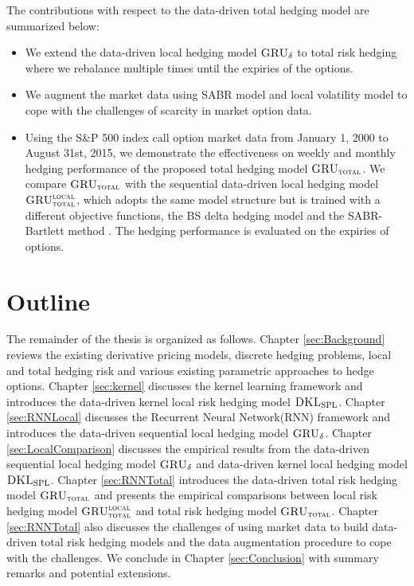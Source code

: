 \documentclass[letterpaper,12pt,titlepage,oneside,final]{book}
\numberwithin{equation}{section}
\theoremstyle{definition}
\newcommand{\model}{\textsc{GRU}_\delta}
\newcommand{\modelT}{\textsc{GRU}_{\textsc{total}}}
\newcommand{\modelL}{\textsc{GRU}_{\textsc{total}}^{\textsc{local}}}
\newcommand{\DKLs}{\bf\textsc{DKL}_{\text{SPL}}}
\begin{document}
The contributions with respect to the data-driven total hedging model \cite{knian2020} are summarized below:
\begin{itemize}
	\item  We extend the data-driven local hedging model $\model$ \cite{knian2019} to total risk hedging  where we rebalance multiple times until the expiries of the options.
	\item  We augment the market data using SABR model and local volatility model to cope with the challenges of scarcity in  market option data.
	\item  Using the S\&P 500 index call option market data from January 1, 2000 to  August 31st, 2015, we demonstrate the effectiveness on  weekly and monthly hedging performance of the proposed total hedging model $\modelT$. We compare $\modelT$ with the sequential data-driven local hedging model $\modelL$, which adopts the same model structure but is trained with a different  objective functions, the BS delta hedging model and the SABR-Bartlett method \cite{bartlett2006hedging}. The hedging performance is evaluated on the expiries of  options. 

\end{itemize}
\section{Outline}
The remainder of the thesis is organized as follows.
Chapter \ref{sec:Background}  reviews the existing derivative pricing models, discrete hedging problems, local and total hedging risk and various existing parametric approaches to hedge options.
Chapter \ref{sec:kernel}  discusses the kernel learning framework and introduces the data-driven kernel local risk hedging model $\DKLs$. 
Chapter \ref{sec:RNNLocal} discusses the Recurrent Neural Network(RNN) framework and introduces the data-driven sequential local hedging model $\model$.
Chapter \ref{sec:LocalComparison} discusses the  empirical results  from  the data-driven sequential local hedging model $\model$ and data-driven kernel local hedging model $\DKLs$. Chapter \ref{sec:RNNTotal} introduces the data-driven  total risk hedging model $\modelT$ and presents the empirical comparisons between local risk hedging model $\modelL$ and total risk hedging model $\modelT$.
Chapter \ref{sec:RNNTotal}  also discusses the challenges of using market data to build data-driven total risk hedging models and the data augmentation procedure to cope with the challenges.
We conclude in Chapter \ref{sec:Conclusion}  with summary remarks and potential extensions.
\end{document}
